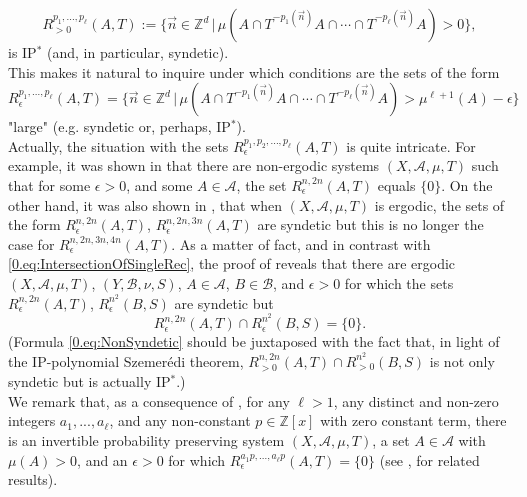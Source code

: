 \documentclass[11pt,american,preprint]{elsarticle}
\numberwithin{equation}{section}
\theoremstyle{plain}
\theoremstyle{plain*}
\theoremstyle{plain}
\theoremstyle{plain*}
\theoremstyle{plain}
\theoremstyle{plain*}
\theoremstyle{remark}
\theoremstyle{remark*}
\theoremstyle{remark}
\theoremstyle{remark*}
\theoremstyle{remark}
\theoremstyle{remark*}
\theoremstyle{plain}
\theoremstyle{definition}
\theoremstyle{plain}
\theoremstyle{plain} %
\newcommand{\Z}{\mathbb{Z}}
\begin{document}
\begin{equation}\label{0.PositiveIntersection}
R_{>0}^{p_1,...,p_\ell}(A,T):=\{\vec n\in\Z^d\,|\,\mu(A\cap T^{-p_1(\vec n)}A\cap \cdots\cap T^{-p_\ell(\vec n)}A)>0\},
\end{equation}
is IP$^*$ (and, in particular, syndetic).\\
This makes it natural to inquire under which conditions are the sets of the form 
\begin{equation}\label{0.eq:LargeVectorIntersections}
R_\epsilon^{p_1,...,p_\ell}(A,T)=\{\vec n\in\Z^d\,|\,\mu(A\cap T^{-p_1(\vec n)}A\cap \cdots\cap T^{-p_\ell(\vec n)}A)>\mu^{\ell+1}(A)-\epsilon\}
\end{equation}
"large" (e.g. syndetic or, perhaps, IP$^*$).\\
Actually, the situation with the sets $R_\epsilon^{p_1,p_2,...,p_\ell}(A,T)$ is quite intricate.
For example,  it was shown in \cite{BHKNilSystems2005} that there are non-ergodic systems  $(X,\mathcal A,\mu,T)$ such that for some  $\epsilon>0$, and some $A\in\mathcal A$, the set $R_\epsilon^{n,2n}(A,T)$ equals $\{0\}$. On the other hand, it was also shown in \cite{BHKNilSystems2005}, that when  $(X,\mathcal A,\mu,T)$ is ergodic,  the sets of the  form $R_\epsilon^{n,2n}(A,T)$, $R_\epsilon^{n,2n,3n}(A,T)$  are syndetic but this is no longer the case for $R_\epsilon^{n,2n,3n,4n}(A,T)$. As a matter of fact, and in contrast with \eqref{0.eq:IntersectionOfSingleRec}, the proof of  \cite[Proposition 1.9] {DonosoLeSunMoreiraLowerBounds} reveals that there are ergodic $(X,\mathcal A,\mu,T)$, $(Y,\mathcal B,\nu,S)$, $A\in\mathcal A$, $B\in\mathcal B$, and $\epsilon>0$ for which  the sets $R_\epsilon^{n,2n}(A,T)$, $R_\epsilon^{n^2}(B,S)$ are syndetic but  
\begin{equation}\label{0.eq:NonSyndetic}
R_\epsilon^{n,2n}(A,T)\cap R_\epsilon^{n^2}(B,S)=\{0\}.
\end{equation}
(Formula \eqref{0.eq:NonSyndetic} should be juxtaposed with the fact  that, in light of the IP-polynomial Szemer{\'e}di theorem, $R_{>0}^{n,2n}(A,T)\cap R_{>0}^{n^2}(B,S)$ is not only syndetic but is actually  IP$^*$.) \\
We remark that,  as a consequence of \cite[Corollary 11.6]{ABBLargeIntersection2021}, for any $\ell>1$, any distinct and non-zero integers $a_1,...,a_\ell$, and any non-constant $p\in\Z[x]$ with zero constant term, there is an invertible probability preserving system $(X,\mathcal A,\mu,T)$, a set $A\in\mathcal A$ with $\mu(A)>0$, and an $\epsilon>0$ for which  $R_\epsilon^{a_1p,...,a_\ell p}(A,T)=\{0\}$ (see \cite{fra2008ThreePolynomials}, \cite{DonosoLeSunMoreiraLowerBounds} for related results).
\end{document}
